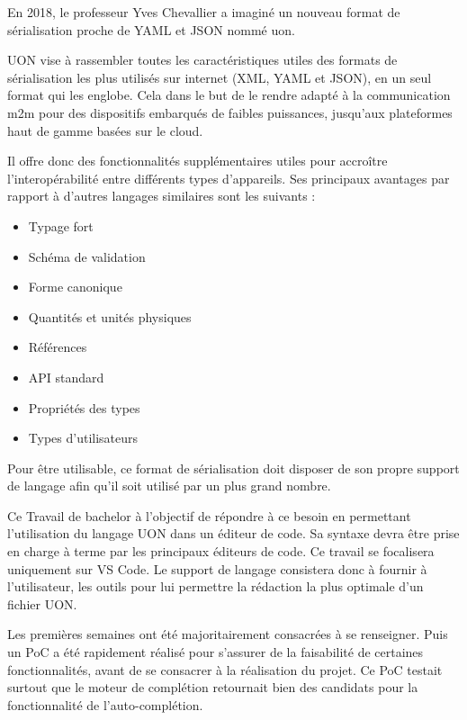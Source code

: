 
En 2018, le professeur Yves Chevallier a imaginé un nouveau format de sérialisation proche de YAML et JSON nommé \Gls{uon}.

UON vise à rassembler toutes les caractéristiques utiles des formats de sérialisation les plus utilisés sur internet (XML, YAML et JSON),
en un seul format qui les englobe. Cela dans le but de le rendre adapté à la communication \Gls{m2m} pour des dispositifs embarqués de faibles puissances, jusqu'aux plateformes haut de gamme basées sur le cloud.

Il offre donc des fonctionnalités supplémentaires utiles pour accroître l'interopérabilité entre différents types d'appareils. Ses principaux avantages par rapport à d'autres langages similaires sont les suivants :

\begin{itemize}
    \item Typage fort
    \item Schéma de validation
    \item Forme canonique
    \item Quantités et unités physiques
    \item Références
    \item API standard
    \item Propriétés des types
    \item Types d'utilisateurs
\end{itemize}

Pour être utilisable, ce format de sérialisation doit disposer de son propre support de langage afin qu'il soit utilisé par un plus grand nombre.

Ce Travail de bachelor à l'objectif de répondre à ce besoin en permettant l'utilisation du langage UON dans un éditeur de code.
Sa syntaxe devra être prise en charge à terme par les principaux éditeurs de code. Ce travail se focalisera uniquement sur VS Code.
Le support de langage consistera donc à fournir à l'utilisateur, les outils pour lui permettre la rédaction la plus optimale d'un fichier UON.

Les premières semaines ont été majoritairement consacrées à se renseigner.
Puis un \Gls{PoC} a été rapidement réalisé pour s'assurer de la faisabilité de certaines fonctionnalités, avant de se consacrer à la réalisation du projet.
Ce PoC testait surtout que le moteur de complétion retournait bien des candidats pour la fonctionnalité de l'auto-complétion.

